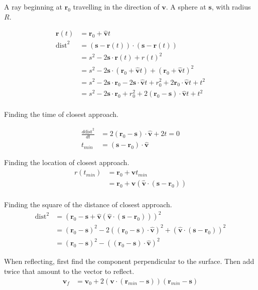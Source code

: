 \documentclass{article}
\newcommand{\hatvec}[1]{\hat{\vec{#1}}}
\renewcommand{\vec}[1]{\mathbf{#1}}
\begin{document}
A ray beginning at $\vec r_0$ travelling in the direction of $\vec v$.
A sphere at $\vec s$, with radius $R$.

\begin{align*}
  \vec r(t) &= \vec r_0 + \hatvec v t \\
  \textrm{dist}^2
  &= (\vec s - \vec r(t)) \cdot (\vec s - \vec r(t)) \\
  &= s^2 - 2\vec s \cdot \vec r(t) + r(t)^2 \\
  &= s^2 - 2\vec s \cdot (\vec r_0 + \hatvec v t) + (\vec r_0 + \hatvec v t)^2 \\
  &= s^2 - 2\vec s \cdot \vec r_0 - 2\vec s \cdot \hatvec v t
        + r_0^2 + 2\vec r_0 \cdot \hatvec v t + t^2 \\
  &= s^2 - 2\vec s \cdot \vec r_0 + r_0^2
        + 2(\vec r_0-\vec s) \cdot \hatvec v t + t^2 \\
\end{align*}

Finding the time of closest approach.

\begin{align*}
  \frac{d\textrm{dist}^2}{dt}
  &= 2(\vec r_0 - \vec s) \cdot \hatvec v + 2t = 0 \\
  t_{min} &= (\vec s - \vec r_0) \cdot \hatvec v
\end{align*}

Finding the location of closest approach.
\begin{align*}
  r(t_{min})
  &= \vec r_0 + \hatvec v t_{min} \\
  &= \vec r_0 + \hatvec v \left(\hatvec v \cdot (\vec s - \vec r_0) \right) \\
\end{align*}

Finding the square of the distance of closest approach.
\begin{align*}
  \textrm{dist}^2
  &= \left(\vec r_0 - \vec s
            + \hatvec v \left(\hatvec v \cdot (\vec s - \vec r_0) \right)\right)^2 \\
  &= (\vec r_0 - \vec s)^2
       - 2\left((\vec r_0 - \vec s)\cdot \hatvec v\right)^2
            + \left(\hatvec v \cdot (\vec s - \vec r_0) \right)^2 \\
  &= (\vec r_0 - \vec s)^2
       - \left((\vec r_0 - \vec s)\cdot \hatvec v\right)^2
\end{align*}

When reflecting, first find the component perpendicular to the surface.
Then add twice that amount to the vector to reflect.
\begin{align*}
  \vec v_f &= \vec v_0 + 2(\vec v \cdot (\vec r_{min}-\vec s))(\vec r_{min}-\vec s)
\end{align*}
\end{document}
